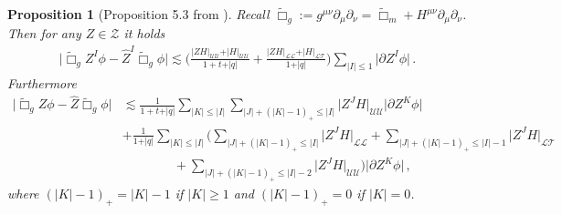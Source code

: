 \documentclass[11pt, a4paper]{amsart}
\numberwithin{equation}{section}
\newtheorem{proposition}[theorem]{Proposition}
\numberwithin{theorem}{section}
\newcommand{\p}{\partial}
\newcommand{\mn}{{\mu \nu}}
\newcommand{\tbox}{\widetilde{\Box}}
\newcommand{\UU}{{\mathcal{U} \mathcal{U}}}
\newcommand{\LL}{{\mathcal{L} \mathcal{L}}}
\newcommand{\LT}{{\mathcal{L} \mathcal{T}}}
\newcommand{\vK}{\vert K \vert}
\newcommand{\qv}{\vert q \vert}
\newcommand{\I}{\vert I \vert}
\newcommand{\J}{\vert J \vert}
\begin{document}
\begin{proposition}[Proposition 5.3 from \cite{LR:04}] \label{prop-5.3}
Recall  $\tbox_g := g^\mn \p_\mu \p_\nu = \tbox_m + H^\mn \p_\mu \p_\nu$. Then for any $Z \in \mathcal{Z}$ it holds
\begin{align*}
\vert \tbox_g Z^I \phi - \hat{Z}^I \tbox_g \phi \vert \lesssim \Big( \frac{\vert ZH \vert_\UU + \vert H \vert_\UU}{1+t+\qv} + \frac{\vert ZH \vert_\LL + \vert H \vert_\LT}{1+\qv} \Big) \sum_{\vert I \vert \leq 1 } \vert \p Z^I \phi \vert \,.
\end{align*}
Furthermore
\begin{align*}
\vert \tbox_g Z \phi - \hat{Z} \tbox_g \phi \vert & \lesssim \frac{1}{1+t+\qv} \sum_{ \vK  \leq  \I } \sum_{\J + (\vK-1)_+ \leq \I} \vert Z^J H \vert_\UU \vert \p Z^K \phi \vert  \\ & + \frac{1}{1+\qv}  \sum_{\vK \leq \I}\Big( \sum_{\J + (\vK-1)_+ \leq \I} \vert Z^J H \vert_\LL + \sum_{\J  + (\vK-1)_+ \leq \I-1} \vert Z^J H \vert_\LT \\ & \qquad \qquad + \sum_{\J + (\vK-1)_+ \leq \I-2} \vert Z^J H \vert_\UU \Big) \vert \p Z^K \phi \vert \,,
\end{align*}
where $(\vK - 1)_+ = \vK - 1$ if $\vK \geq 1$ and $(\vK-1)_+ = 0$ if $\vK = 0$. 
\end{proposition}




\end{document}
